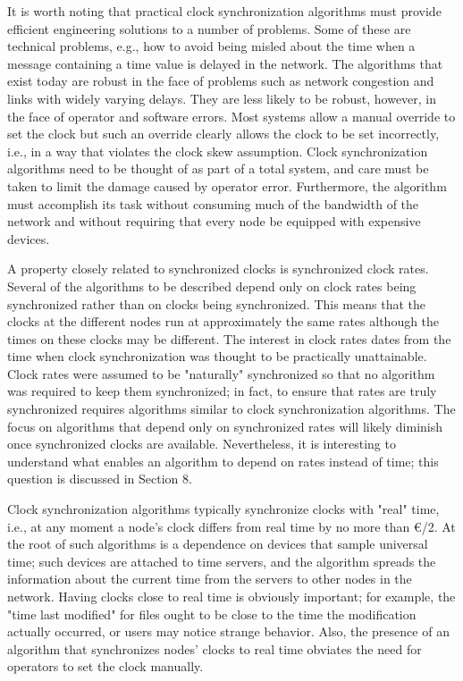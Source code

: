 \documentclass[a4paper,11pt,notitlepage,twoside,openright]{article}
\begin{document}
It is worth noting that practical clock synchronization algorithms must
provide efficient engineering solutions to a number of problems. Some of
these are technical problems, e.g., how to avoid being misled about the
time when a message containing a time value is delayed in the network.
The algorithms that exist today are robust in the face of problems such
as network congestion and links with widely varying delays. They are
less likely to be robust, however, in the face of operator and software
errors. Most systems allow a manual override to set the clock but such
an override clearly allows the clock to be set incorrectly, i.e., in a
way that violates the clock skew assumption. Clock synchronization
algorithms need to be thought of as part of a total system, and care
must be taken to limit the damage caused by operator error. Furthermore,
the algorithm must accomplish its task without consuming much of the
bandwidth of the network and without requiring that every node be
equipped with expensive devices.

A property closely related to synchronized clocks is synchronized clock
rates. Several of the algorithms to be described depend only on clock
rates being synchronized rather than on clocks being synchronized. This
means that the clocks at the different nodes run at approximately the
same rates although the times on these clocks may be different. The
interest in clock rates dates from the time when clock synchronization
was thought to be practically unattainable. Clock rates were assumed to
be "naturally" synchronized so that no algorithm was required to keep
them synchronized; in fact, to ensure that rates are truly synchronized
requires algorithms similar to clock synchronization algorithms. The
focus on algorithms that depend only on synchronized rates will likely
diminish once synchronized clocks are available. Nevertheless, it is
interesting to understand what enables an algorithm to depend on rates
instead of time; this question is discussed in Section 8.

Clock synchronization algorithms typically synchronize clocks with
"real" time, i.e., at any moment a node's clock differs from real time
by no more than €/2. At the root of such algorithms is a dependence on
devices that sample universal time; such devices are attached to time
servers, and the algorithm spreads the information about the current
time from the servers to other nodes in the network. Having clocks close
to real time is obviously important; for example, the "time last
modified" for files ought to be close to the time the modification
actually occurred, or users may notice strange behavior. Also, the
presence of an algorithm that synchronizes nodes' clocks to real time
obviates the need for operators to set the clock manually.
\end{document}
